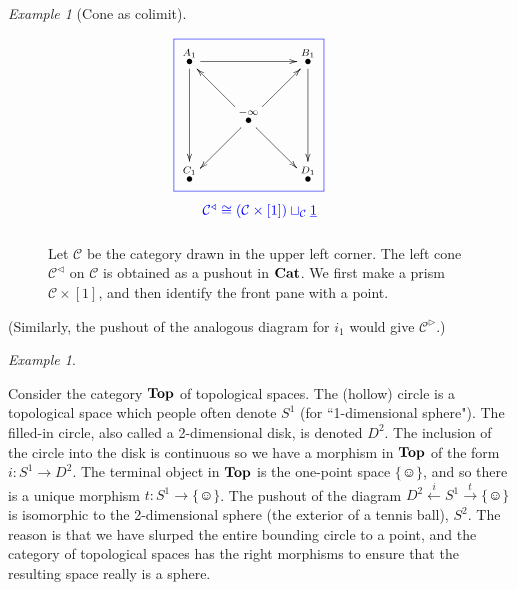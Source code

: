 \documentclass{book}
\newcommand{\cfbox}[2]{
    \colorlet{currentcolor}{.}
    {\color{#1}
    \fbox{\color{currentcolor}#2}}
}
\def\mc{\mathcal}
\def\singleton{\{\smiley\}}
\def\lcone{^\triangleleft}
\def\rcone{^\triangleright}
\def\to{\rightarrow}
\def\taking{\colon}
\def\iso{\cong}
\def\ul{\underline}
\newcommand{\LMO}[1]{\stackrel{#1}{\bullet}}
\newcommand{\To}[1]{\xrightarrow{#1}}
\newcommand{\From}[1]{\xleftarrow{#1}}
\def\Top{{\bf Top}}
\def\Cat{{\bf Cat}}
\def\mcC{\mc{C}}
\theoremstyle{remark}
\newtheorem{example}[subsubsection]{Example}
\theoremstyle{definition}
\begin{document}
\begin{example}[Cone as colimit]
\begin{figure}[H]
$$\parbox{1.7in}{\cfbox{blue}{\parbox{1.7in}{
\xymatrix{
\LMO{A_1}\ar[rr]\ar[dd]&&\LMO{B_1}\ar[dd]\\
&\LMO{-\infty}\ar[ur]\ar[dr]\ar[ul]\ar[dl]\\
\LMO{C_1}&&\LMO{D_1}}}}\begin{center}\color{blue}{$\mcC\lcone\iso(\mcC\times[1])\sqcup_{\mcC}\ul{1}$}\end{center}}
$$
\caption{Let $\mcC$ be the category drawn in the upper left corner. The left cone $\mcC\lcone$ on $\mcC$ is obtained as a pushout in $\Cat$. We first make a prism $\mcC\times[1]$, and then identify the front pane with a point.}
\label{fig:left cone}
\end{figure}
(Similarly, the pushout of the analogous diagram for $i_1$ would give $\mcC\rcone$.)

\end{example}

\begin{example}\label{ex:pushout in Top}

Consider the category $\Top$ of topological spaces. The (hollow) circle is a topological space which people often denote $S^1$ (for ``1-dimensional sphere"). The filled-in circle, also called a 2-dimensional disk, is denoted $D^2$. The inclusion of the circle into the disk is continuous so we have a morphism in $\Top$ of the form $i\taking S^1\to D^2$. The terminal object in $\Top$ is the one-point space $\singleton$, and so there is a unique morphism $t\taking S^1\to\singleton$. The pushout of the diagram $D^2\From{i}S^1\To{t}\singleton$ is isomorphic to the 2-dimensional sphere (the exterior of a tennis ball), $S^2$. The reason is that we have slurped the entire bounding circle to a point, and the category of topological spaces has the right morphisms to ensure that the resulting space really is a sphere. 

\end{example}
\end{document}
